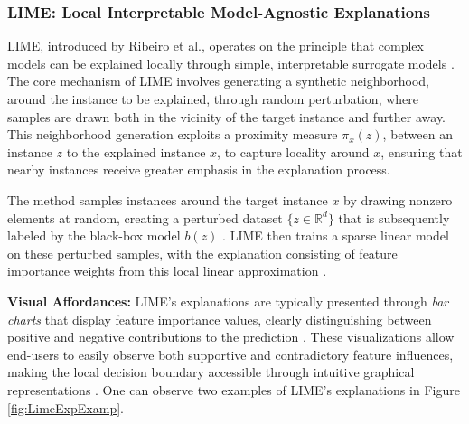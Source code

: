 \subsubsection{LIME: Local Interpretable Model-Agnostic Explanations}

LIME, introduced by Ribeiro et al.\cite{ribeiro2016should}, operates on the principle that complex models can be explained locally through simple, interpretable surrogate models \cite{ribeiro2016should, bodria2023benchmarking}. The core mechanism of LIME involves generating a synthetic neighborhood, around the instance to be explained, through random perturbation, where samples are drawn both in the vicinity of the target instance and further away\cite{ribeiro2016should, bodria2023benchmarking}. This neighborhood generation exploits a proximity measure $\pi_x(z)$, between an instance $z$ to the explained instance $x$, to capture locality around $x$, ensuring that nearby instances receive greater emphasis in the explanation process.

The method samples instances around the target instance $x$ by drawing nonzero elements at random, creating a perturbed dataset $\{z \in \mathbb{R}^d\}$ that is subsequently labeled by the black-box model $b(z)$ \cite{ribeiro2016should, bodria2023benchmarking}. LIME then trains a sparse linear model on these perturbed samples, with the explanation consisting of feature importance weights from this local linear approximation \cite{ribeiro2016should, guidotti2022stable}.

\textbf{Visual Affordances:} LIME's explanations are typically presented through \textit{bar charts} that display feature importance values, clearly distinguishing between positive and negative contributions to the prediction \cite{alicioglu2021survey, ribeiro2016should}. These visualizations allow end-users to easily observe both supportive and contradictory feature influences, making the local decision boundary accessible through intuitive graphical representations \cite{alicioglu2021survey}. One can observe two examples of LIME's explanations in Figure \ref{fig:LimeExpExamp}.

